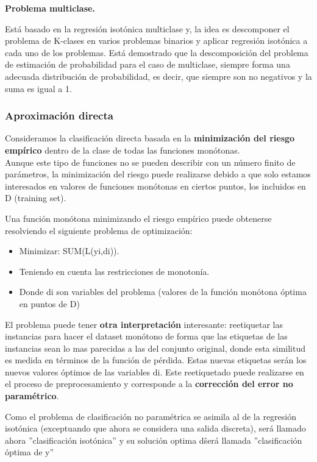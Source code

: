 \textbf{Problema multiclase.}

Está basado en la regresión isotónica multiclase y, la idea es descomponer el problema de K-clases en varios problemas binarios
y aplicar regresión isotónica a cada uno de los problemas.
Está demostrado que la descomposición del problema de estimación de 
probabilidad para el caso de multiclase, siempre forma una adecuada 
distribución de probabilidad, es decir, que siempre son no negativos
y la suma es igual a 1.


\subsubsection{Aproximación directa}

Consideramos la clasificación directa basada en la\textbf{ minimización del riesgo 
empírico} dentro de la clase de todas las funciones monótonas.\\
Aunque este tipo de funciones no se pueden describir con un número 
finito de parámetros, la minimización del riesgo puede realizarse debido a 
que solo estamos interesados en valores de funciones monótonas en ciertos
puntos, los incluidos en D (training set).

Una función monótona minimizando el riesgo empírico puede obtenerse resolviendo
el siguiente problema de optimización:

\begin{itemize}
	\item Minimizar: SUM(L(yi,di)).
	\item Teniendo en cuenta las restricciones de monotonía.
	\item Donde di son variables del problema (valores de la función monótona óptima
	en puntos de D)
\end{itemize}

El problema puede tener \textbf{otra interpretación} interesante: reetiquetar las
instancias para hacer el dataset monótono de forma que las etiquetas de las
instancias sean lo mas parecidas a las del conjunto original, donde esta 
similitud es medida en términos de la función de pérdida. Estas nuevas
etiquetas serán los nuevos valores óptimos de las variables di. 
Este reetiquetado puede realizarse en el proceso de preprocesamiento
y corresponde a la \textbf{corrección del error no paramétrico}.

Como el problema de clasificación no paramétrica se asimila al de la regresión
isotónica (exceptuando que ahora se considera una salida discreta), será llamado
ahora ''clasificación isotónica'' y su solución optima d\^ será llamada
''clasificación óptima de y''




\newpage

